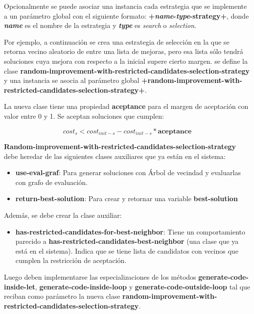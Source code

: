 Opcionalmente se puede asociar una instancia cada estrategia que se implemente a un parámetro global con el siguiente formato: \textbf{+\textit{name}-\textit{type}-strategy+}, donde \textbf{\textit{name}} es el nombre de la estrategia y \textbf{\textit{type}} es \textit{search} o \textit{selection}.


Por ejemplo, a continuación se crea una estrategia de selección en la que se retorna vecino aleatorio de entre una lista de mejoras, pero esa lista sólo tendrá soluciones cuya mejora con respecto a la inicial supere cierto margen. se define la clase \textbf{random-improvement-with-restricted-candidates-selection-strategy} y una instancia se asocia al parámetro global \textbf{+random-improvement-with-restricted-candidates-selection-strategy+}.

La nueva clase tiene una propiedad \textbf{aceptance} para el margen de aceptación con valor entre 0 y 1. Se aceptan soluciones que cumplen:

$$
cost_s < cost_{init-s} - cost_{init-s} * \textbf{aceptance} 
$$

\textbf{Random-improvement-with-restricted-candidates-selection-strategy} debe heredar de las siguientes clases auxiliares que ya están en el sistema:

\begin{itemize}
	\item \textbf{use-eval-graf}: Para generar soluciones con Árbol de vecindad y evaluarlas con grafo de evaluación.
	\item \textbf{return-best-solution}: Para crear y retornar una variable \textbf{best-solution}
\end{itemize}

Además, se debe crear la clase auxiliar:

\begin{itemize}
	\item \textbf{has-restricted-candidates-for-best-neighbor}: Tiene un comportamiento parecido a \textbf{has-restricted-candidates-best-neighbor} (una clase que ya está en el sistema). Indica que se tiene lista de candidatos con vecinos que cumplen la restricción de aceptación.
\end{itemize}

Luego deben implementarse las especializaciones de los métodos \textbf{generate-code-inside-let}, \textbf{generate-code-inside-loop} y \textbf{generate-code-outside-loop} tal que reciban como parámetro la nueva clase \textbf{random-improvement-with-restricted-candidates-selection-strategy}.

